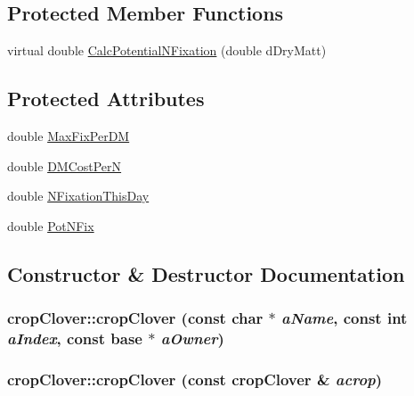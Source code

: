 \subsection*{Protected Member Functions}
\begin{DoxyCompactItemize}
\item 
virtual double \hyperlink{classcrop_clover_a5747ba184ba2174f4ace80757d75f9a5}{CalcPotentialNFixation} (double dDryMatt)
\end{DoxyCompactItemize}
\subsection*{Protected Attributes}
\begin{DoxyCompactItemize}
\item 
double \hyperlink{classcrop_clover_a1d9dbe99654e2faa451ab20ff6653683}{MaxFixPerDM}
\item 
double \hyperlink{classcrop_clover_a9b3c11041d71e6050fe2831c22318ed3}{DMCostPerN}
\item 
double \hyperlink{classcrop_clover_a86608517e507f0b9cb914ca4ae9e9293}{NFixationThisDay}
\item 
double \hyperlink{classcrop_clover_a0a358b6c4673755725925ab5cb959059}{PotNFix}
\end{DoxyCompactItemize}


\subsection{Constructor \& Destructor Documentation}
\hypertarget{classcrop_clover_ae780963421392a4e2c5fb05a54c8fb29}{
\subsubsection[{cropClover}]{\setlength{\rightskip}{0pt plus 5cm}cropClover::cropClover (const char $\ast$ {\em aName}, \/  const int {\em aIndex}, \/  const {\bf base} $\ast$ {\em aOwner})}}
\label{classcrop_clover_ae780963421392a4e2c5fb05a54c8fb29}
\hypertarget{classcrop_clover_af45dd76dec2da31cb7910dfbc93965d2}{
\subsubsection[{cropClover}]{\setlength{\rightskip}{0pt plus 5cm}cropClover::cropClover (const {\bf cropClover} \& {\em acrop})}}
\label{classcrop_clover_af45dd76dec2da31cb7910dfbc93965d2}


